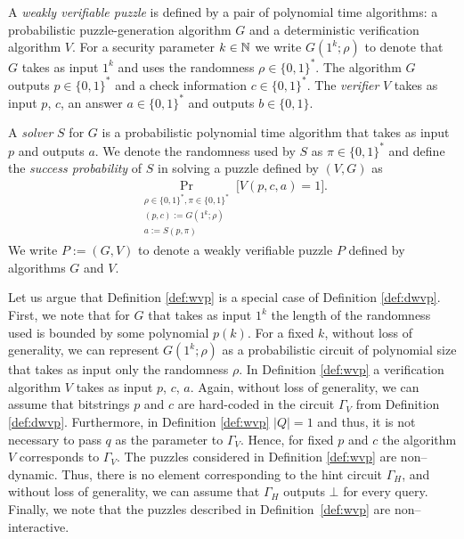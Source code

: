 \begin{definition}
  \label{def:wvp}
A \textit{weakly verifiable puzzle} is defined by a pair of polynomial time algorithms:
a probabilistic puzzle-generation algorithm $G$ and a deterministic verification algorithm $V$.
For a security parameter $k \in \mathbb{N}$ we write $G(1^k; \rho)$ to denote that $G$ takes as input $1^k$
and uses the randomness $\rho \in \{0,1\}^{*}$.
The algorithm $G$ outputs $p \in \{0,1\}^{*}$ and a check information $c \in \{0,1\}^{*}$.
The \textit{verifier} $V$ takes as input $p$, $c$, an answer $a \in \{0,1\}^{*}$ and outputs $b \in \{0,1\}$.

A \textit{solver} $S$ for $G$ is a probabilistic polynomial time algorithm that
takes as input $p$ and outputs $a$. We denote the randomness used by $S$ as $\pi \in \{0,1\}^{*}$
and define the \textit{success probability} of $S$ in solving a puzzle defined by $(V,G)$ as
\begin{align*}
  \underset{\substack{\rho \in \{0,1\}^{*}, \pi \in \{0,1\}^{*} \\ (p,c):=G(1^k; \rho) \\ a := S(p, \pi)}}{\Pr}\Big[ V(p,c,a) = 1\Big].
\end{align*}
We write $P := (G,V)$ to denote a weakly verifiable puzzle $P$ defined by algorithms $G$ and $V$.
\end{definition}

Let us argue that Definition \ref{def:wvp} is a special case of Definition \ref{def:dwvp}.
First, we note that for $G$ that takes as input $1^k$ the length of the randomness used is bounded by some polynomial $p(k)$.
For a fixed $k$, without loss of generality, we can represent $G(1^k; \rho)$ as a probabilistic circuit of polynomial size
that takes as input only the randomness $\rho$.
In Definition \ref{def:wvp} a verification algorithm $V$ takes as input $p$, $c$, $a$.
Again, without loss of generality, we can assume that bitstrings $p$ and $c$ are hard-coded
in the circuit $\Gamma_V$ from Definition \ref{def:dwvp}.
Furthermore, in Definition \ref{def:wvp} $|Q| = 1$ and thus, it is not necessary to pass $q$ as the parameter to $\Gamma_V$.
Hence, for fixed $p$ and $c$ the algorithm $V$ corresponds to $\Gamma_V$.
The puzzles considered in Definition \ref{def:wvp} are non--dynamic.
Thus, there is no element corresponding to the hint circuit $\Gamma_H$, and without loss of generality, we can assume that
$\Gamma_H$ outputs $\bot$ for every query.
Finally, we note that the puzzles described in Definition~\ref{def:wvp} are non--interactive.

